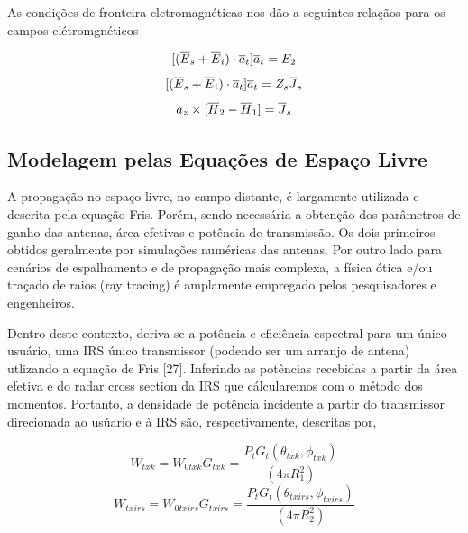 \documentclass[
	12pt,				%
	openright,			%
	oneside,			%
	a4paper,			%
	english,			%
	brazil				%
	]{abntex2}
\begin{document}
As condições de fronteira eletromagnéticas nos dão a seguintes relaçãos para os campos elétromgnéticos

\begin{equation}{\label{BoundaryFields}}
 [(\overline{E}_s+\overline{E}_{i})\cdot \overline{a}_t]\overline{a}_t=E_2
\end{equation}
\begin{equation}{\label{BoundaryFieldsImp}}
 [(\overline{E}_s+\overline{E}_{i})\cdot \overline{a}_t]\overline{a}_t=Z_s\overline{J}_{s}
\end{equation}
\begin{equation}{\label{BoundaryCurrent}}
  \overline{a}_z  \times [{\overline{H}_{2}-\overline{H}_{1}} ]=\overline{J}_{s}
\end{equation}

\subsection{Modelagem pelas Equações de Espaço Livre}\label{FormulaçãoFreeSpace
Balanis}

A propagação no espaço livre, no campo distante, é largamente utilizada e descrita pela equação Fris. Porém, sendo necessária a obtenção dos parâmetros de ganho das antenas, área efetivas e potência de transmissão. Os dois primeiros obtidos geralmente por simulações numéricas das antenas. Por outro lado para cenários de espalhamento e de propagação mais complexa, a física ótica e/ou traçado de raios (ray tracing) é amplamente empregado pelos pesquisadores e engenheiros.

Dentro deste contexto, deriva-se a potência e eficiência espectral para um único usuário, uma IRS único transmissor (podendo ser um arranjo de antena) utlizando a equação de Fris {[}27{]}. Inferindo as potências
recebidas a partir da área efetiva e do radar cross section da IRS que cálcularemos com o método dos momentos. Portanto, a densidade de potência incidente a partir do transmissor direcionada ao usúario e à IRS são, respectivamente, descritas por,

\begin{equation}
W_{txk} = W_{0txk}G_{txk} = \frac{P_{t}G_{t}(\theta_{txk},\phi_{txk})}{(4\pi R_{1}^{2})}
\end{equation}
\begin{equation}
    W_{txirs} = W_{0txirs}G_{txirs} = \frac{P_{t}G_{t}(\theta_{txirs},\phi_{txirs})}{(4\pi R_{2}^{2})}
\end{equation}
\end{document}
